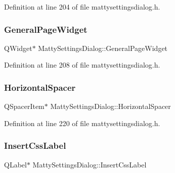 Definition at line 204 of file mattysettingsdialog.\+h.

\hypertarget{classMattySettingsDialog_af9ea43e4ed86bbcce00c3e33ba360455}{}\label{classMattySettingsDialog_af9ea43e4ed86bbcce00c3e33ba360455} 
\subsubsection{\texorpdfstring{General\+Page\+Widget}{GeneralPageWidget}}
{\footnotesize\ttfamily Q\+Widget$\ast$ Matty\+Settings\+Dialog\+::\+General\+Page\+Widget\hspace{0.3cm}{\ttfamily [private]}}



Definition at line 208 of file mattysettingsdialog.\+h.

\hypertarget{classMattySettingsDialog_a83bd6a20a2ce05082e4258c82d8a82cb}{}\label{classMattySettingsDialog_a83bd6a20a2ce05082e4258c82d8a82cb} 
\subsubsection{\texorpdfstring{Horizontal\+Spacer}{HorizontalSpacer}}
{\footnotesize\ttfamily Q\+Spacer\+Item$\ast$ Matty\+Settings\+Dialog\+::\+Horizontal\+Spacer\hspace{0.3cm}{\ttfamily [private]}}



Definition at line 220 of file mattysettingsdialog.\+h.

\hypertarget{classMattySettingsDialog_aed8d05ed2c013c77b15b0a22d0a3b604}{}\label{classMattySettingsDialog_aed8d05ed2c013c77b15b0a22d0a3b604} 
\subsubsection{\texorpdfstring{Insert\+Css\+Label}{InsertCssLabel}}
{\footnotesize\ttfamily Q\+Label$\ast$ Matty\+Settings\+Dialog\+::\+Insert\+Css\+Label\hspace{0.3cm}{\ttfamily [private]}}



